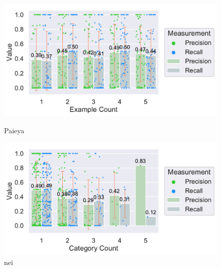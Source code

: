 \documentclass[\myrootdir/main.tex]{subfiles}
\begin{document}
\begin{figure}[htbp]
	\centering
	\begin{minipage}{0.45\textwidth}
		\centering
		\includegraphics[width=\textwidth, clip]{img/big-study/recall-precision-examplecount-TS.pdf}
		\caption{Paieya}
		\label{fig:recall-precision-examplecount-TS}
	\end{minipage}\hfill
	\begin{minipage}{0.45\textwidth}
		\centering
		\includegraphics[width=\textwidth, clip]{img/big-study/recall-precision-categorycount-TS.pdf}
		\caption{nei}
		\label{fig:recall-precision-categorycount-TS}
	\end{minipage}
\end{figure}
\end{document}
